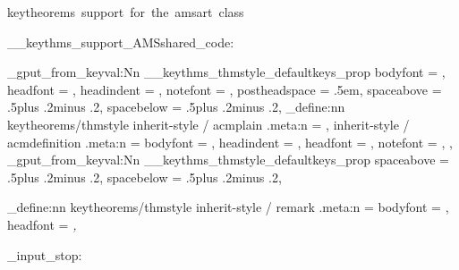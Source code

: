   {keytheorems~support~for~the~amsart~class}

\__keythms_support_AMSshared_code:

  { %
    \prop_gput_from_keyval:Nn \g__keythms_thmstyle_defaultkeys_prop
      {
        bodyfont      = \@acmplainbodyfont,
        headfont      = \@acmplainheadfont,
        headindent    = \@acmplainindent,
        notefont      = \@acmplainnotefont,
        postheadspace = .5em,
        spaceabove    = .5\baselineskip plus .2\baselineskip minus .2\baselineskip,
        spacebelow    = .5\baselineskip plus .2\baselineskip minus .2\baselineskip,
      }
    \keys_define:nn { keytheorems/thmstyle }
      {
        inherit-style / acmplain      .meta:n = {},
        inherit-style / acmdefinition .meta:n =
          {
            bodyfont   = \@acmdefinitionbodyfont,
            headindent = \@acmdefinitionindent,
            headfont   = \@acmdefinitionheadfont,
            notefont   = \@acmdefinitionnotefont,
          },
      }
  }
  {
    \prop_gput_from_keyval:Nn \g__keythms_thmstyle_defaultkeys_prop
      {
        spaceabove    = .5\baselineskip plus .2\baselineskip minus .2\baselineskip,
        spacebelow    = .5\baselineskip plus .2\baselineskip minus .2\baselineskip,
      }
  }

\keys_define:nn { keytheorems/thmstyle }
  {
    inherit-style / remark .meta:n =
      {
        bodyfont = \normalfont,
        headfont = \itshape,
      }
  }

\file_input_stop: